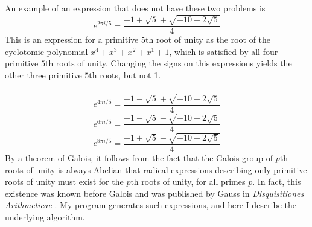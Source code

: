 \documentclass{article}
\begin{document}
    An example of an expression that does not have these two problems is
$$ e^{2 \pi i/5} = \frac{-1 + \sqrt{5} + \sqrt{-10 - 2 \sqrt{5}}}{4} $$
    This is an expression for a primitive $ 5 $th root of unity as the root of the cyclotomic polynomial $ x^4 + x^3 + x^2 + x^1 + 1 $, which is satisfied by all four primitive $ 5 $th roots of unity. Changing the signs on this expressions yields the other three primitive $ 5 $th roots, but not 1.\\
    \\
$$ e^{4 \pi i/5} = \frac{-1 - \sqrt{5} + \sqrt{-10 + 2 \sqrt{5}}}{4} $$
$$ e^{6 \pi i/5} = \frac{-1 - \sqrt{5} - \sqrt{-10 + 2 \sqrt{5}}}{4} $$
$$ e^{8 \pi i/5} = \frac{-1 + \sqrt{5} - \sqrt{-10 - 2 \sqrt{5}}}{4} $$
    By a theorem of Galois, it follows from the fact that the Galois group of $ p $th roots of unity is always Abelian that radical expressions describing only primitive roots of unity must exist for the $ p $th roots of unity, for all primes $ p $. In fact, this existence was known before Galois and was published by Gauss in \textit{Disquisitiones Arithmeticae} \cite{gauss}. My program generates such expressions, and here I describe the underlying algorithm.\\
    \\
\end{document}
